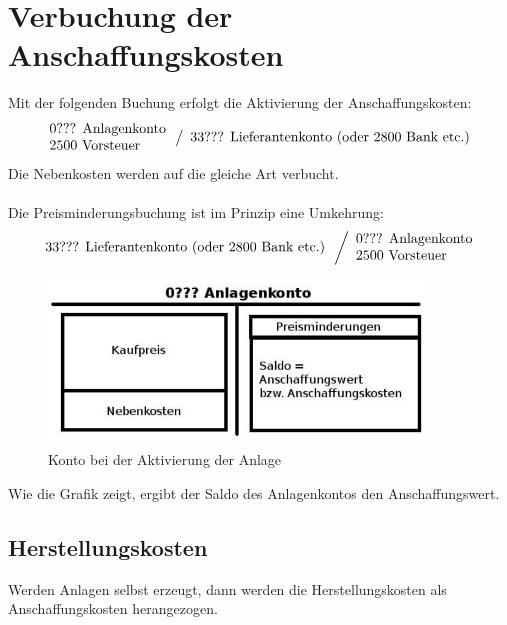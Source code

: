 \documentclass[a4paper,10pt]{report}
\begin{document}
\section{Verbuchung der Anschaffungskosten}
Mit der folgenden Buchung erfolgt die Aktivierung der
Anschaffungskosten:
\begin{equation*}
  \label{eq:anschaffungsbuchung}
  \begin{array}{l}
    \text{0??? Anlagenkonto}\\
    \text{2500 Vorsteuer}\\
  \end{array}
  \left\slash
  \begin{array}{l}
    \text{33??? Lieferantenkonto (oder 2800 Bank etc.)}\\
  \end{array}
\right.
\end{equation*}
Die Nebenkosten werden auf die gleiche Art verbucht.
\\\\
Die Preisminderungsbuchung ist im Prinzip eine Umkehrung:
\begin{equation*}
  \begin{array}{l}
    \text{33??? Lieferantenkonto (oder 2800 Bank etc.)}\\
  \end{array}
  \left\slash
  \begin{array}{l}
    \text{0??? Anlagenkonto}\\
    \text{2500 Vorsteuer}\\
  \end{array}
\right.
\end{equation*}

\begin{figure}[ht]
\centering
\includegraphics[width=10cm]{Bilder/Anlagenaktivierung}
\caption{Konto bei der Aktivierung der Anlage}%
\end{figure}
Wie die Grafik zeigt, ergibt der Saldo des Anlagenkontos den
Anschaffungswert.

\subsection{Herstellungskosten}
Werden Anlagen selbst erzeugt, dann werden die Herstellungskosten als
Anschaffungskosten herangezogen.
\end{document}
